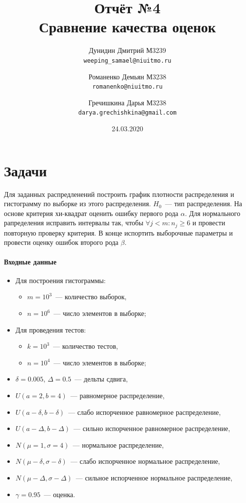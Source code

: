 \documentclass{article}
\title{\textbf{Отчёт №4}\\
Сравнение качества оценок}
\author{
    Дунидин Дмитрий М3239\\
    \texttt{weeping\_samael@niuitmo.ru}
    \and
    Романенко Демьян М3238\\
    \texttt{romanenko@niuitmo.ru}
    \and
    Гречишкина Дарья М3238\\
    \texttt{darya.grechishkina@gmail.com}
}
\date{24.03.2020}
\begin{document}
	\maketitle
	\newpage

\maketitle
    \section{Задачи}
        Для заданных распредленений построить график плотности распределения и гистограмму по выборке из этого распределения. $H_0$~--- тип распределения. На основе критерия хи-квадрат оценить ошибку первого рода $\alpha$. Для нормального рапределения исправить интервалы так, чтобы $\forall j < m : n_j \geq 6$ и провести повторную проверку критерия. В конце испортить выборочные параметры и провести оценку ошибок второго рода $\beta$.
        \paragraph{Входные данные}
            \begin{itemize}
                \item Для построения гистограммы: 
                \begin{itemize}
                    \item $m = 10^3$~--- количество выборок,
                    \item $n = 10^6$~--- число элементов в выборке;
                \end{itemize}
                \item Для проведения тестов:
                \begin{itemize}
                    \item $k = 10^3$~--- количество тестов,
                    \item $n = 10^4$~--- число элементов в выборке;
                \end{itemize}
                \item $\delta = 0.005$, $\Delta = 0.5$~--- дельты сдвига,
                \item $U(a = 2, b = 4)$~--- равномерное распределение,
                \item $U(a - \delta, b - \delta)$~--- слабо испорченное равномерное распределение,
                \item $U(a - \Delta, b - \Delta)$~--- сильно испорченное равномерное распределение,
                \item $N(\mu = 1, \sigma = 4)$~--- нормальное распределение,
                \item $N(\mu - \delta, \sigma - \delta)$~--- слабо испорченное нормальное распределение,
                \item $N(\mu - \Delta, \sigma - \Delta)$~--- сильное испорченное нормальное распределение,
                \item $\gamma = 0.95$~--- оценка.
            \end{itemize}
\end{document}
